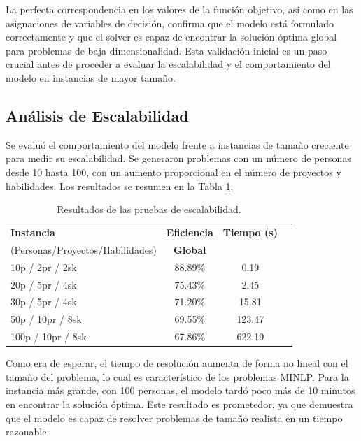\documentclass[conference]{IEEEtran}
\begin{document}
La perfecta correspondencia en los valores de la función objetivo, así como en las asignaciones de variables de decisión, confirma que el modelo está formulado correctamente y que el solver es capaz de encontrar la solución óptima global para problemas de baja dimensionalidad. Esta validación inicial es un paso crucial antes de proceder a evaluar la escalabilidad y el comportamiento del modelo en instancias de mayor tamaño.

\subsection{Análisis de Escalabilidad}
Se evaluó el comportamiento del modelo frente a instancias de tamaño creciente para medir su escalabilidad. Se generaron problemas con un número de personas desde 10 hasta 100, con un aumento proporcional en el número de proyectos y habilidades. Los resultados se resumen en la Tabla \ref{tab:escalabilidad}.

\begin{table}[htbp]
    \centering
    \caption{Resultados de las pruebas de escalabilidad.}
    \label{tab:escalabilidad}
    \begin{tabularx}{\linewidth}{@{}lccc@{}}
        \toprule
        \textbf{Instancia}               & \textbf{Eficiencia} & \textbf{Tiempo (s)} \\
        (Personas/Proyectos/Habilidades) & \textbf{Global}     &                     \\
        \midrule
        10p / 2pr / 2sk                  & 88.89\%             & 0.19                \\
        20p / 5pr / 4sk                  & 75.43\%             & 2.45                \\
        30p / 5pr / 4sk                  & 71.20\%             & 15.81               \\
        50p / 10pr / 8sk                 & 69.55\%             & 123.47              \\
        100p / 10pr / 8sk                & 67.86\%             & 622.19              \\
        \bottomrule
    \end{tabularx}
\end{table}

Como era de esperar, el tiempo de resolución aumenta de forma no lineal con el tamaño del problema, lo cual es característico de los problemas MINLP. Para la instancia más grande, con 100 personas, el modelo tardó poco más de 10 minutos en encontrar la solución óptima. Este resultado es prometedor, ya que demuestra que el modelo es capaz de resolver problemas de tamaño realista en un tiempo razonable.
\end{document}
